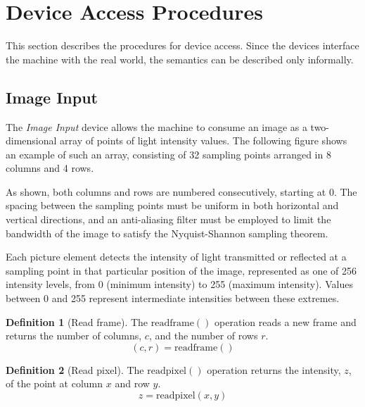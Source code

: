 \documentclass[a4paper,10pt]{article}
\newcommand{\ReadPixel}[1]{\mathrm{readpixel}(#1)}
\newcommand{\ReadFrame}[1]{\mathrm{readframe}(#1)}
\theoremstyle{definition}
\newtheorem{definition}{Definition}
\begin{document}
\section{Device Access Procedures}

This section describes the procedures for device access.
Since the devices interface the machine with the real world, the semantics can be described only informally.

\subsection{Image Input}
\label{sec:image-input}
The \emph{Image Input} device allows the machine to consume an image as a two-dimensional array of points of light intensity values.
The following figure shows an example of such an array, consisting of 32 sampling points arranged in 8 columns and 4 rows.
\begin{center}
\end{center}
As shown, both columns and rows are numbered consecutively, starting at 0.
The spacing between the sampling points must be uniform in both horizontal and vertical directions, and an anti-aliasing filter must be employed to limit the bandwidth of the image to satisfy the Nyquist-Shannon sampling theorem.

Each picture element detects the intensity of light transmitted or reflected at a sampling point in that particular position of the image, represented as one of 256 intensity levels, from 0 (minimum intensity) to 255 (maximum intensity).
Values between 0 and 255 represent intermediate intensities between these extremes.

\begin{definition}[Read frame]
  The $\ReadFrame{}$ operation reads a new frame and returns the number of columns, $c$, and the number of rows $r$.
  \[ (c, r) = \ReadFrame{} \]
\end{definition}

\begin{definition}[Read pixel]
  The $\ReadPixel{}$ operation returns the intensity, $z$, of the point at column $x$ and row $y$.
  \[ z = \ReadPixel{x, y} \]
\end{definition}
\end{document}
